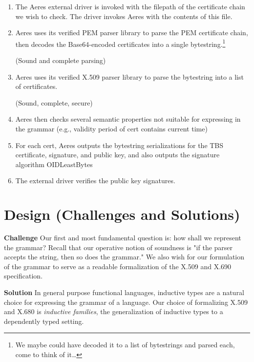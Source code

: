 \documentclass[11pt]{article}
\begin{document}
\begin{enumerate}
\item The Aeres external driver is invoked with the filepath of the certificate
chain we wish to check.
The driver invokes Aeres with the contents of this file.

\item Aeres uses its verified PEM parser library to parse the PEM certificate
chain, then decodes the Base64-encoded certificates into a single
bytestring.\footnote{We maybe could have decoded it to a list of bytestrings and
parsed each, come to think of it\ldots{}}

(Sound and complete parsing)

\item Aeres uses its verified X.509 parser library to parse the bytestring into a
list of certificates.

(Sound, complete, secure)

\item Aeres then checks several semantic properties not suitable for expressing
in the grammar (e.g., validity period of cert contains current time)

\item For each cert, Aeres outputs the bytestring serializations for the TBS
certificate, signature, and public key, and also outputs the signature
algorithm OIDLeastBytes

\item The external driver verifies the public key signatures.
\end{enumerate}



\section{Design (Challenges and Solutions)}
\label{sec:orgbb59e4e}

\textbf{Challenge} Our first and most fundamental question is: how shall we represent
the grammar?
Recall that our operative notion of soundness is "if the parser accepts the
string, then so does the grammar."
We also wish for our formulation of the grammar to serve as a readable
formalization of the X.509 and X.690 specification.

\textbf{Solution} In general purpose functional languages, inductive types are a
natural choice for expressing the grammar of a language.
Our choice of formalizing X.509 and X.680 is \emph{inductive families}, the
generalization of inductive types to a dependently typed setting.
\end{document}
